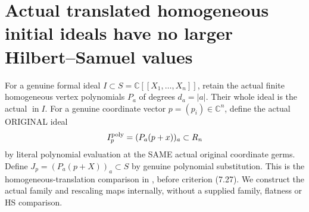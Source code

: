 \section{Actual translated homogeneous initial ideals have no larger Hilbert--Samuel values}

For a genuine formal ideal $I\subset S=\mathbb C[[X_1,\ldots,X_n]]$,
retain the actual finite homogeneous vertex polynomials $P_a$ of degrees
$d_a=|a|$. Their whole ideal is the actual $\operatorname{in}I$.
For a genuine coordinate vector $p=(p_i)\in\mathbb C^n$, define the
actual ORIGINAL ideal
\[
 I_p^{\rm poly}=(P_a(p+x))_a\subset R_n
\]
by literal polynomial evaluation at the SAME actual original coordinate
germs. Define $J_p=(P_a(p+X))_a\subset S$ by genuine polynomial
substitution. This is the homogeneous-translation comparison in
\cite[proof of Theorem~7.20, p.~271]{bierstone-milman97-invent-math},
before criterion (7.27). We construct the actual family and rescaling
maps internally, without a supplied family, flatness or HS comparison.

